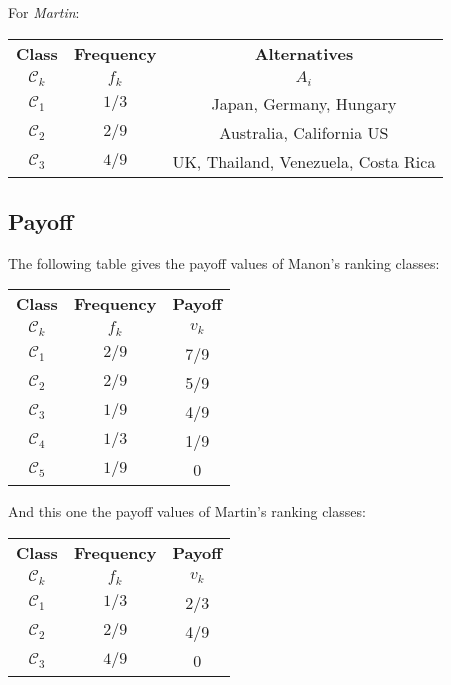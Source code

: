 \documentclass[12pt,a4paper]{article}
\begin{document}
\clearpage
For \textsl{Martin}:
\begin{table}[ht]
\centering
\begin{tabular}{|c|c|c|}
\hline
\textbf{Class}&\textbf{Frequency} &\textbf{Alternatives}\\
$\mathcal{C}_k$ & $f_k$ & $A_i$ \\
\hline
$\mathcal{C}_1$ & $1/3$ & Japan, Germany, Hungary \\
$\mathcal{C}_2$ & $2/9$ & Australia, California US \\
$\mathcal{C}_3$ & $4/9$ & UK, Thailand, Venezuela, Costa Rica \\
\hline
\end{tabular}
\end{table}

\subsection{Payoff}

The following table gives the payoff values of Manon's ranking classes:

\begin{table}[ht]
\centering
\begin{tabular}{|c|c|c|}
\hline
\textbf{Class}&\textbf{Frequency} &\textbf{Payoff}\\
$\mathcal{C}_k$ & $f_k$ & $v_k$ \\
\hline
$\mathcal{C}_1$ & $2/9$ & 7/9 \\
$\mathcal{C}_2$ & $2/9$ & 5/9 \\
$\mathcal{C}_3$ & $1/9$ & 4/9 \\
$\mathcal{C}_4$ & $1/3$ & 1/9 \\
$\mathcal{C}_5$ & $1/9$ & 0 \\
\hline
\end{tabular}
\end{table}

And this one the payoff values of Martin's ranking classes:

\begin{table}[ht]
\centering
\begin{tabular}{|c|c|c|}
\hline
\textbf{Class}&\textbf{Frequency} &\textbf{Payoff}\\
$\mathcal{C}_k$ & $f_k$ & $v_k$ \\
\hline
$\mathcal{C}_1$ & $1/3$ & 2/3  \\
$\mathcal{C}_2$ & $2/9$ & 4/9 \\
$\mathcal{C}_3$ & $4/9$ & 0 \\
\hline
\end{tabular}
\end{table}
\end{document}
